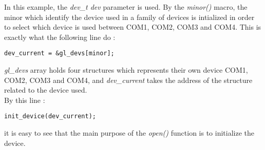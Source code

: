 \documentclass[11pt]{report}
\begin{document}
In this example, the {\it dev\_t dev} parameter is used. By the {\it minor()} macro, the minor
which identify the device used in a family of devices is intialized in order to select which device
is used between COM1, COM2, COM3 and COM4. This is exactly what the following line do :
\begin{lstlisting}
dev_current = &gl_devs[minor];
\end{lstlisting}
{\it gl\_devs} array holds four structures which represents their own device COM1, COM2, COM3
and COM4, and {\it dev\_current} takes the address of the structure related to the device used.\\
By this line :
\begin{lstlisting}
init_device(dev_current);
\end{lstlisting}
it is easy to see that the main purpose of the {\it open()} function is to initialize the device.\\
\end{document}
